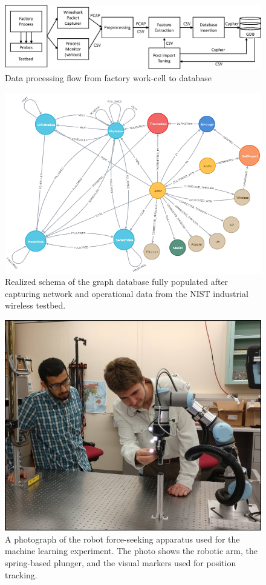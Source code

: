 \documentclass{article}
\begin{document}
		\begin{figure}
			\centering
			\includegraphics[width=\linewidth]{images/info_workflow_tii.eps}
			\caption{Data processing flow from factory work-cell to database}
			\label{gdbappl:fig:database:work-flow}
		\end{figure}
	
		\begin{figure}
			\centering
			\includegraphics[width=\linewidth]{images/graph_schema_updated_2.png}
			\caption{Realized schema of the graph database fully populated after capturing network and operational data from the NIST industrial wireless testbed. \vspace{-0.2in}}
			\label{gdbappl:fig:real-schema}
		\end{figure}
	
	
		\begin{figure}[!tbp]
			\centering
			\includegraphics[width=0.65\columnwidth]{images/PlungerExperiment}
			\caption{A photograph of the robot force-seeking apparatus used for the machine learning experiment.  The photo shows the robotic arm, the spring-based plunger, and the visual markers used for position tracking.}
			\label{fig:photo-forceseeker}
		\end{figure}
		
\end{document}
